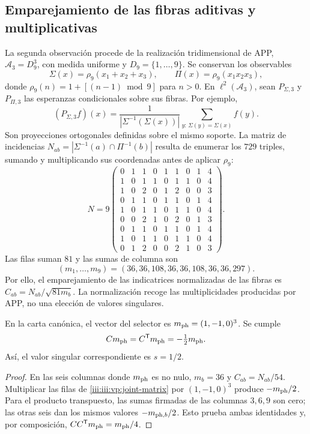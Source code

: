 \subsection{Emparejamiento de las fibras aditivas y multiplicativas}

La segunda observación procede de la realización tridimensional de APP,
$\mathcal A_3=D_9^3$, con medida uniforme y
$D_9=\{1,\ldots,9\}$. Se conservan los observables
\[
 \Sigma(x)=\rho_9(x_1+x_2+x_3),\qquad
 \Pi(x)=\rho_9(x_1x_2x_3),
\]
donde $\rho_9(n)=1+[(n-1)\bmod9]$ para $n>0$. En
$\ell^2(\mathcal A_3)$, sean $P_{\Sigma,3}$ y $P_{\Pi,3}$ las
esperanzas condicionales sobre sus fibras. Por ejemplo,
\[
 (P_{\Sigma,3}f)(x)=
 \frac1{|\Sigma^{-1}(\Sigma(x))|}
 \sum_{y:\,\Sigma(y)=\Sigma(x)}f(y).
\]
Son proyecciones ortogonales definidas sobre el mismo soporte. La matriz
de incidencias $N_{ab}=|\Sigma^{-1}(a)\cap\Pi^{-1}(b)|$ resulta de
enumerar los $729$ triples, sumando y multiplicando sus coordenadas antes
de aplicar $\rho_9$:
\begin{equation}
 N=9\begin{pmatrix}
 0&1&1&0&1&1&0&1&4\\
 1&0&1&1&0&1&1&0&4\\
 1&0&2&0&1&2&0&0&3\\
 0&1&1&0&1&1&0&1&4\\
 1&0&1&1&0&1&1&0&4\\
 0&0&2&1&0&2&0&1&3\\
 0&1&1&0&1&1&0&1&4\\
 1&0&1&1&0&1&1&0&4\\
 0&1&2&0&0&2&1&0&3
 \end{pmatrix}.
 \label{iii:iii:vp:joint-matrix}
\end{equation}
Las filas suman $81$ y las sumas de columna son
\[
 (m_1,\ldots,m_9)=(36,36,108,36,36,108,36,36,297).
\]
Por ello, el emparejamiento de las indicatrices normalizadas de las fibras
es $C_{ab}=N_{ab}/\sqrt{81m_b}$. La normalización recoge las
multiplicidades producidas por APP, no una elección de valores singulares.

\begin{proposition}
En la carta canónica, el vector del selector es
$m_{\rm ph}=(1,-1,0)^3$. Se cumple
\begin{equation}
 Cm_{\rm ph}=C^{\mathsf T}m_{\rm ph}=-\tfrac12m_{\rm ph}.
 \label{iii:iii:vp:trit-mode}
\end{equation}
Así, el valor singular correspondiente es $s=1/2$.
\end{proposition}
\begin{proof}
En las seis columnas donde $m_{\rm ph}$ es no nulo, $m_b=36$ y
$C_{ab}=N_{ab}/54$. Multiplicar las filas de
\eqref{iii:iii:vp:joint-matrix} por $(1,-1,0)^3$ produce
$-m_{\rm ph}/2$. Para el producto transpuesto, las sumas firmadas
de las columnas $3,6,9$ son cero; las otras seis dan los mismos
valores $-m_{{\rm ph},b}/2$. Esto prueba ambas identidades y, por
composición, $CC^{\mathsf T}m_{\rm ph}=m_{\rm ph}/4$.
\end{proof}


